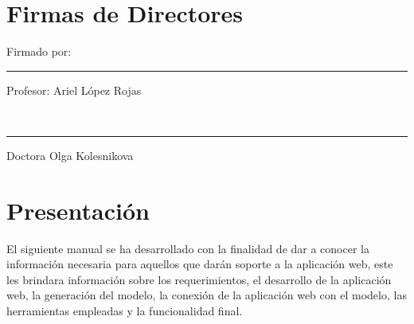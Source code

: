 \documentclass[12pt, a4paper, titlepage]{article}
\begin{document}
	\newpage
	\section*{Firmas de Directores}
	
	\vfill  %
	\noindent 
	\parbox[b]{0.4\linewidth}{%
		\strut 
		Firmado por: \\[3cm]%
		\hrule
		Profesor: Ariel López Rojas} 
	\hspace{1cm} %
	\parbox[b]{0.4\linewidth}{%
		\strut 
		\\[3cm]%
		\hrule
		Doctora Olga Kolesnikova} 
	\par\vspace{1cm} 
	\newpage
	\renewcommand\appendixpagename{Índice}
	\renewcommand\appendixtocname{Índice}
	\appendixpageoff
	\begin{appendices}
		\renewcommand*\contentsname{{\textcolor{azulescom}{Índice.}}}
		\tableofcontents
		\newpage
		\renewcommand*\listfigurename{{\textcolor{azulescom}{Índice de figuras.}}}
		\listoffigures
		\newpage
		\newpage
		\renewcommand*\listtablename{{\textcolor{azulescom}{Índice de cuadros.}}}
		\listoftables
		\newpage
	\end{appendices}
	
	\section{Presentación}
	El siguiente manual se ha desarrollado con la finalidad de dar a conocer la información necesaria para aquellos que darán soporte a la aplicación web, este les brindara información sobre los requerimientos, el desarrollo de la aplicación web, la generación del modelo, la conexión de la aplicación web con el modelo, las herramientas empleadas y la funcionalidad final.
\end{document}
